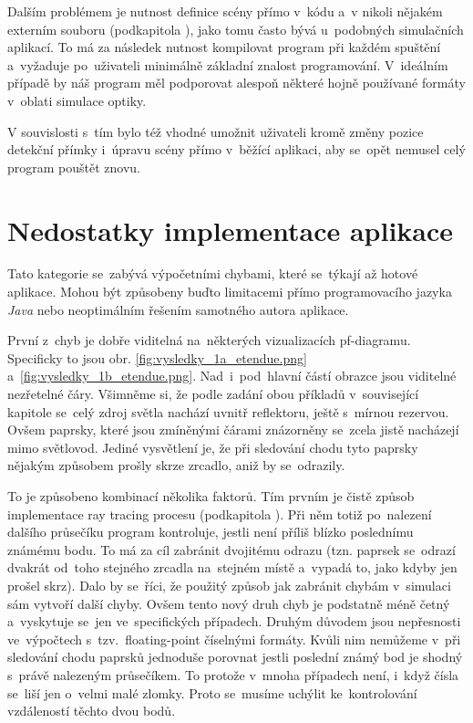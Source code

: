 Dalším problémem je nutnost definice scény přímo v~kódu a~v nikoli nějakém externím souboru (podkapitola ), jako tomu často bývá u~podobných simulačních aplikací. To má za následek nutnost kompilovat program při každém spuštění a~vyžaduje po~uživateli minimálně základní znalost programování. V~ideálním případě by náš program měl podporovat alespoň některé hojně používané formáty v~oblati simulace optiky.

V souvislosti s~tím bylo též vhodné umožnit uživateli kromě změny pozice detekční přímky i~úpravu scény přímo v~běžící aplikaci, aby se~opět nemusel celý program pouštět znovu.

\section{Nedostatky implementace aplikace}

Tato kategorie se~zabývá výpočetními chybami, které se~týkají až hotové aplikace. Mohou být způsobeny buďto limitacemi přímo programovacího jazyka \emph{Java} nebo neoptimálním řešením samotného autora aplikace.

První z~chyb je dobře viditelná na~některých vizualizacích pf-diagramu. Specificky to jsou obr. \ref{fig:vysledky_1a_etendue.png} a~\ref{fig:vysledky_1b_etendue.png}. Nad~i~pod~hlavní částí obrazce jsou viditelné nezřetelné čáry. Všimněme si, že podle zadání obou příkladů v~související kapitole  se~celý zdroj světla nachází uvnitř reflektoru, ještě s~mírnou rezervou. Ovšem paprsky, které jsou zmíněnými čárami znázorněny se~zcela jistě nacházejí mimo světlovod. Jediné vysvětlení je, že při sledování chodu tyto paprsky nějakým způsobem prošly skrze zrcadlo, aniž by se~odrazily.

To je způsobeno kombinací několika faktorů. Tím prvním je čistě způsob implementace ray tracing procesu (podkapitola ). Při něm totiž po~nalezení dalšího průsečíku program kontroluje, jestli není příliš blízko poslednímu známému bodu. To má za cíl zabránit dvojitému odrazu (tzn. paprsek se~odrazí dvakrát od~toho stejného zrcadla na~stejném místě a~vypadá to, jako kdyby jen prošel skrz). Dalo by se~říci, že použitý způsob jak zabránit chybám v~simulaci sám vytvoří další chyby. Ovšem tento nový druh chyb je podstatně méně četný a~vyskytuje se~jen ve~specifických případech. Druhým důvodem jsou nepřesnosti ve~výpočtech s~tzv.~floating-point číselnými formáty. \parencite{ieee2008floating} Kvůli nim nemůžeme v~při sledování chodu paprsků jednoduše porovnat jestli poslední známý bod je shodný s~právě nalezeným průsečíkem. To protože v~mnoha případech není, i~když čísla se~liší jen o~velmi malé zlomky. Proto se~musíme uchýlit ke~kontrolování vzdáleností těchto dvou bodů.

